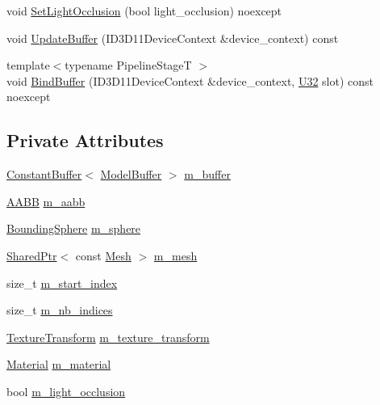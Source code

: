 \begin{DoxyCompactItemize}
\item 
void \mbox{\hyperlink{classmage_1_1rendering_1_1_model_a4064c86786e7dca7907435da1dce83a4}{Set\+Light\+Occlusion}} (bool light\+\_\+occlusion) noexcept
\item 
void \mbox{\hyperlink{classmage_1_1rendering_1_1_model_a31b3d4f544c8cfea4ad2054d594b2c53}{Update\+Buffer}} (I\+D3\+D11\+Device\+Context \&device\+\_\+context) const
\item 
{\footnotesize template$<$typename Pipeline\+StageT $>$ }\\void \mbox{\hyperlink{classmage_1_1rendering_1_1_model_a1247b104dff5f0eb1039b6e3ac0213ae}{Bind\+Buffer}} (I\+D3\+D11\+Device\+Context \&device\+\_\+context, \mbox{\hyperlink{namespacemage_a41c104c036fba3756a74e19f793eeaa1}{U32}} slot) const noexcept
\end{DoxyCompactItemize}
\subsection*{Private Attributes}
\begin{DoxyCompactItemize}
\item 
\mbox{\hyperlink{classmage_1_1rendering_1_1_constant_buffer}{Constant\+Buffer}}$<$ \mbox{\hyperlink{structmage_1_1rendering_1_1_model_buffer}{Model\+Buffer}} $>$ \mbox{\hyperlink{classmage_1_1rendering_1_1_model_a82132035b4631143bed489c4bc190f95}{m\+\_\+buffer}}
\item 
\mbox{\hyperlink{classmage_1_1_a_a_b_b}{A\+A\+BB}} \mbox{\hyperlink{classmage_1_1rendering_1_1_model_a7b3bb86ad718ba3dae2b1c6042fdeaec}{m\+\_\+aabb}}
\item 
\mbox{\hyperlink{classmage_1_1_bounding_sphere}{Bounding\+Sphere}} \mbox{\hyperlink{classmage_1_1rendering_1_1_model_a88220cb828f0df79489c512245560616}{m\+\_\+sphere}}
\item 
\mbox{\hyperlink{namespacemage_a1e01ae66713838a7a67d30e44c67703e}{Shared\+Ptr}}$<$ const \mbox{\hyperlink{classmage_1_1rendering_1_1_mesh}{Mesh}} $>$ \mbox{\hyperlink{classmage_1_1rendering_1_1_model_a38be646490affe6bd2f2f2bb61d04caa}{m\+\_\+mesh}}
\item 
size\+\_\+t \mbox{\hyperlink{classmage_1_1rendering_1_1_model_a6144f71f0f1d539f5664b07088859751}{m\+\_\+start\+\_\+index}}
\item 
size\+\_\+t \mbox{\hyperlink{classmage_1_1rendering_1_1_model_abc3536c8511523e459fd245ef3c487f2}{m\+\_\+nb\+\_\+indices}}
\item 
\mbox{\hyperlink{classmage_1_1_texture_transform}{Texture\+Transform}} \mbox{\hyperlink{classmage_1_1rendering_1_1_model_a00ad04fc770af700b97f69c83dc01d70}{m\+\_\+texture\+\_\+transform}}
\item 
\mbox{\hyperlink{classmage_1_1rendering_1_1_material}{Material}} \mbox{\hyperlink{classmage_1_1rendering_1_1_model_a933d2f661f511908e7c1e9030cfc777d}{m\+\_\+material}}
\item 
bool \mbox{\hyperlink{classmage_1_1rendering_1_1_model_a796fd0c51ea194826dde990b10e70856}{m\+\_\+light\+\_\+occlusion}}
\end{DoxyCompactItemize}
